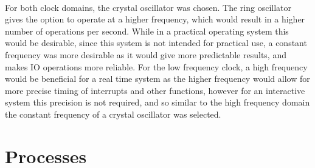 \\
For both clock domains, the crystal oscillator was chosen. The ring oscillator gives the option to operate at a higher frequency, which would result in a higher number of operations per second. While in a practical operating system this would be desirable, since this system is not intended for practical use, a constant frequency was more desirable as it would give more predictable results, and makes IO operations more reliable. For the low frequency clock, a high frequency would be beneficial for a real time system as the higher frequency would allow for more precise timing of interrupts and other functions, however for an interactive system this precision is not required, and so similar to the high frequency domain the constant frequency of a crystal oscillator was selected.
\section{Processes}
